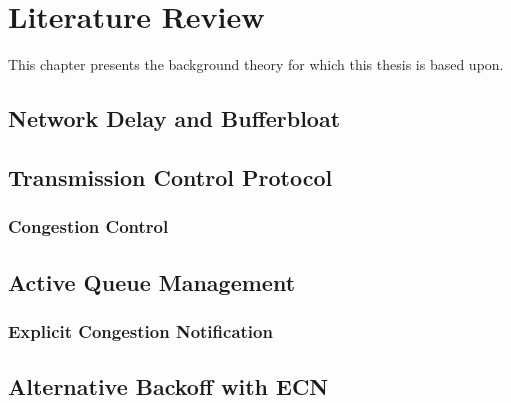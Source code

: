 \chapter{Literature Review}

This chapter presents the background theory for which this thesis is based upon.


\section{Network Delay and Bufferbloat}


\section{Transmission Control Protocol}

\subsection{Congestion Control}



\section{Active Queue Management}

\subsection{Explicit Congestion Notification}



\section{Alternative Backoff with ECN}

